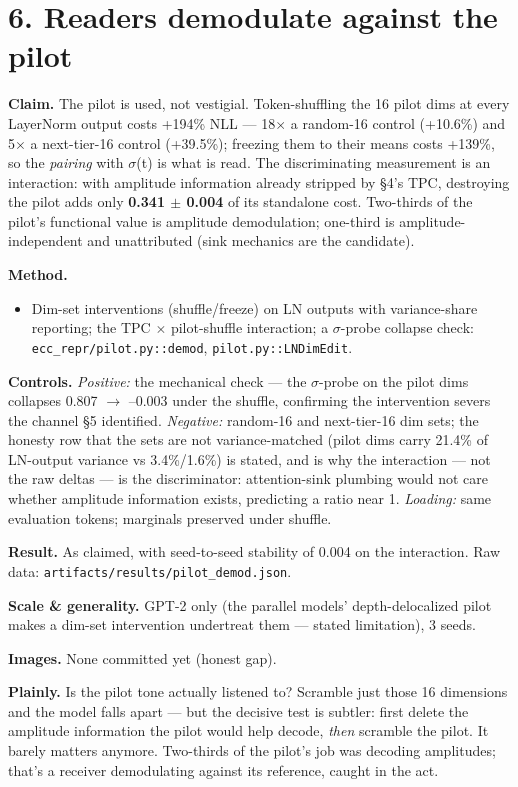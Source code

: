 \documentclass[10pt]{article}
\begin{document}
\section{6. Readers demodulate against the pilot}

\textbf{Claim.} The pilot is used, not vestigial. Token-shuffling the 16 pilot dims at every LayerNorm
output costs +194\% NLL --- 18$\times$ a random-16 control (+10.6\%) and 5$\times$ a next-tier-16 control (+39.5\%);
freezing them to their means costs +139\%, so the \emph{pairing} with $\sigma$(t) is what is read. The
discriminating measurement is an interaction: with amplitude information already stripped by §4's
TPC, destroying the pilot adds only \textbf{0.341 $\pm$ 0.004} of its standalone cost. Two-thirds of the
pilot's functional value is amplitude demodulation; one-third is amplitude-independent and
unattributed (sink mechanics are the candidate).

\textbf{Method.}
\begin{itemize}\setlength\itemsep{1pt}
\item Dim-set interventions (shuffle/freeze) on LN outputs with variance-share reporting; the TPC $\times$ pilot-shuffle interaction; a $\sigma$-probe collapse check: \texttt{ecc\_repr/pilot.py::demod}, \texttt{pilot.py::LNDimEdit}.
\end{itemize}
\textbf{Controls.} \emph{Positive:} the mechanical check --- the $\sigma$-probe on the pilot dims collapses 0.807 $\to$
--0.003 under the shuffle, confirming the intervention severs the channel §5 identified.
\emph{Negative:} random-16 and next-tier-16 dim sets; the honesty row that the sets are not
variance-matched (pilot dims carry 21.4\% of LN-output variance vs 3.4\%/1.6\%) is stated, and is why
the interaction --- not the raw deltas --- is the discriminator: attention-sink plumbing would not care
whether amplitude information exists, predicting a ratio near 1. \emph{Loading:} same evaluation
tokens; marginals preserved under shuffle.

\textbf{Result.} As claimed, with seed-to-seed stability of 0.004 on the interaction. Raw data:
\texttt{artifacts/results/pilot\_demod.json}.

\textbf{Scale \& generality.} GPT-2 only (the parallel models' depth-delocalized pilot makes a dim-set
intervention undertreat them --- stated limitation), 3 seeds.

\textbf{Images.} None committed yet (honest gap).

\textbf{Plainly.} Is the pilot tone actually listened to? Scramble just those 16 dimensions and the
model falls apart --- but the decisive test is subtler: first delete the amplitude information the
pilot would help decode, \emph{then} scramble the pilot. It barely matters anymore. Two-thirds of the
pilot's job was decoding amplitudes; that's a receiver demodulating against its reference, caught
in the act.
\end{document}
